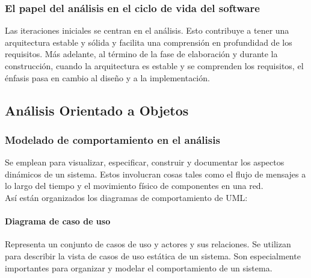 \subsubsection{El papel del análisis en el ciclo de vida del software}
Las iteraciones iniciales se centran en el análisis. Esto contribuye a tener una arquitectura estable y sólida y facilita una comprensión en profundidad de los requisitos. Más adelante, al término de la fase de elaboración y durante la construcción, cuando la arquitectura es estable y se comprenden los requisitos, el énfasis pasa en cambio al diseño y a la implementación.
\subsection{Análisis Orientado a Objetos}
\subsubsection{Modelado de comportamiento en el análisis}
Se emplean para visualizar, especificar, construir y documentar los aspectos dinámicos de un sistema. Estos involucran cosas tales como el flujo de mensajes a lo largo del tiempo y el movimiento físico de componentes en una red.\\
Así están organizados los diagramas de comportamiento de UML:
\begin{comment}
\begin{description}
\item[Diagramas de caso de uso] Organiza los comportamientos del sistema.
\item[Diagramas de secuencia] Centrados en la ordenación temporal de los mensajes.
\item[Diagramas de comunicación] Centrados en la organización estructural de los objetos que envían y reciben mensajes.
\item[Diagramas de estados] Centrados en el estado cambiante de un sistema dirigido por eventos.
\item[Diagramas de actividades] Centrados en el flujo de control de actividades.
\end{description}
\end{comment}
\paragraph{Diagrama de caso de uso} 
Representa un conjunto de casos de uso y actores y sus relaciones. Se utilizan para describir la vista de casos de uso estática de un sistema. Son especialmente importantes para organizar y modelar el comportamiento de un sistema.
